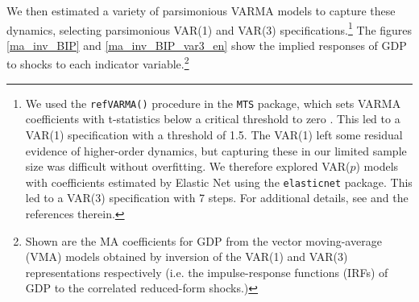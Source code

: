 \documentclass[11pt,a4paper]{article}
\begin{document}
We then estimated a variety of parsimonious VARMA models to capture these dynamics, selecting parsimonious VAR(1) and VAR(3) specifications.\footnote{We used the \texttt{refVARMA()} procedure in the \cite{MTSpackage} \texttt{MTS} package, which sets VARMA coefficients with t-statistics below a critical threshold to zero \citep[see][]{tsay2013multivariate}.  This led to a VAR(1) specification with a threshold of 1.5. The VAR(1) left some residual evidence of higher-order dynamics, but capturing these in our limited sample size was difficult without overfitting. We therefore explored VAR($p$) models with coefficients estimated by Elastic Net using the \cite{ElasticNet} \texttt{elasticnet} package.  This led to a VAR(3) specification with 7 steps. For additional details, see \cite{ElasticNet} and the references therein.} The figures \eqref{ma_inv_BIP} and \eqref{ma_inv_BIP_var3_en} show the implied responses of GDP to shocks to each indicator variable.\footnote{Shown are the MA coefficients for GDP from the vector moving-average (VMA) models obtained by inversion of the VAR(1) and VAR(3) representations respectively (i.e. the impulse-response functions (IRFs) of GDP to the correlated reduced-form shocks.)} 

%
%



%
%
%
\end{document}
